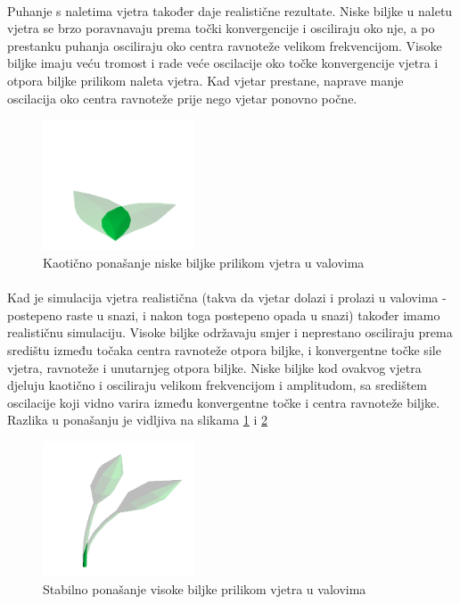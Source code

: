 \documentclass[times, utf8, diplomski]{fer}
\begin{document}
\paragraph{}
Puhanje s naletima vjetra također daje realistične rezultate. Niske biljke u 
naletu vjetra se brzo poravnavaju prema točki konvergencije i osciliraju oko 
nje, a po prestanku puhanja osciliraju oko centra ravnoteže velikom 
frekvencijom. Visoke biljke imaju veću tromost i rade veće oscilacije oko točke
konvergencije vjetra i otpora biljke prilikom naleta vjetra. Kad vjetar 
prestane, naprave manje oscilacija oko centra ravnoteže prije nego vjetar 
ponovno počne.
\begin{figure}[h]
	\centering
	\includegraphics[width=0.4\textwidth]{img/52-1}
	\caption{Kaotično ponašanje niske biljke prilikom vjetra u valovima}
	\label{fig:52-1}
\end{figure}
\paragraph{}
Kad je simulacija vjetra realistična (takva da vjetar dolazi i prolazi u 
valovima - postepeno raste u snazi, i nakon toga postepeno opada u snazi) 
također imamo realističnu simulaciju. Visoke biljke održavaju smjer i neprestano 
osciliraju prema središtu između točaka centra ravnoteže otpora biljke, i 
konvergentne točke sile vjetra, ravnoteže i unutarnjeg otpora biljke. Niske 
biljke kod ovakvog vjetra djeluju kaotično i osciliraju velikom frekvencijom i 
amplitudom, sa središtem oscilacije koji vidno varira između konvergentne točke 
i centra ravnoteže biljke. Razlika u ponašanju je vidljiva na slikama \ref{fig:52-1} i \ref{fig:52-2}
\begin{figure}[h]
	\centering
	\includegraphics[width=0.4\textwidth]{img/52-2}
	\caption{Stabilno ponašanje visoke biljke prilikom vjetra u valovima}
	\label{fig:52-2}
\end{figure}
\end{document}
